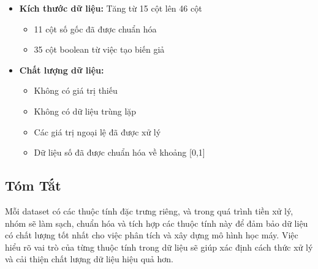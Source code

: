 \begin{itemize}
    \item \textbf{Kích thước dữ liệu:} Tăng từ 15 cột lên 46 cột
    \begin{itemize}
        \item 11 cột số gốc đã được chuẩn hóa
        \item 35 cột boolean từ việc tạo biến giả
    \end{itemize}
    \item \textbf{Chất lượng dữ liệu:}
    \begin{itemize}
        \item Không có giá trị thiếu
        \item Không có dữ liệu trùng lặp
        \item Các giá trị ngoại lệ đã được xử lý
        \item Dữ liệu số đã được chuẩn hóa về khoảng [0,1]
    \end{itemize}
\end{itemize}

\subsection*{Tóm Tắt}
Mỗi dataset có các thuộc tính đặc trưng riêng, và trong quá trình tiền xử lý, nhóm sẽ làm sạch, chuẩn hóa và tích hợp các thuộc tính này để đảm bảo dữ liệu có chất lượng tốt nhất cho việc phân tích và xây dựng mô hình học máy. Việc hiểu rõ vai trò của từng thuộc tính trong dữ liệu sẽ giúp xác định cách thức xử lý và cải thiện chất lượng dữ liệu hiệu quả hơn.